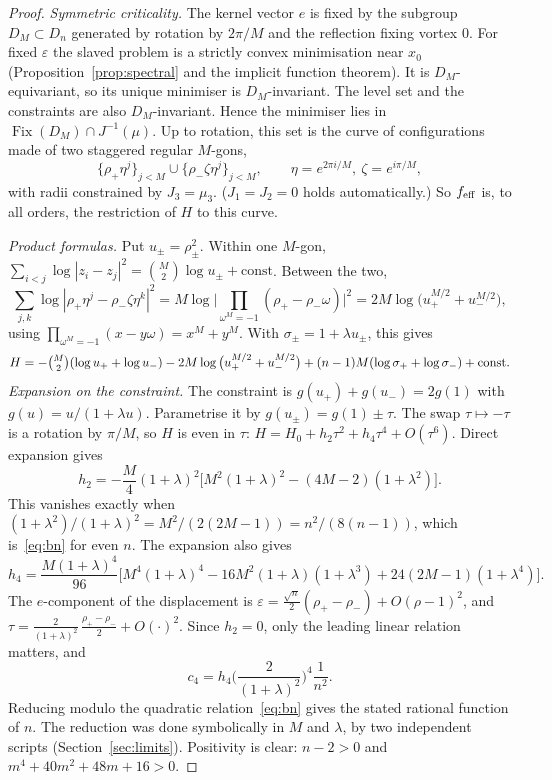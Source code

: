 \documentclass[11pt]{article}
\theoremstyle{definition}
\theoremstyle{remark}
\begin{document}
\begin{proof}
\emph{Symmetric criticality.} The kernel vector $e$ is fixed by the subgroup $D_M\subset D_n$ generated by
rotation by $2\pi/M$ and the reflection fixing vortex $0$. For fixed $\varepsilon$ the slaved problem is a
strictly convex minimisation near $x_0$ (Proposition~\ref{prop:spectral} and the implicit function
theorem). It is $D_M$-equivariant, so its unique minimiser is $D_M$-invariant. The level set and the
constraints are also $D_M$-invariant. Hence the minimiser lies in $\operatorname{Fix}(D_M)\cap J^{-1}(\mu)$.
Up to rotation, this set is the curve of configurations made of two staggered regular $M$-gons,
\[
\{\rho_+\eta^j\}_{j<M}\cup\{\rho_-\zeta\eta^j\}_{j<M},\qquad \eta=e^{2\pi i/M},\ \zeta=e^{i\pi/M},
\]
with radii constrained by $J_3=\mu_3$. ($J_1=J_2=0$ holds automatically.) So $f_{\rm eff}$ is, to all orders,
the restriction of $H$ to this curve.

\emph{Product formulas.} Put $u_\pm=\rho_\pm^2$. Within one $M$-gon,
$\sum_{i<j}\log|z_i-z_j|^2=\binom M2\log u_\pm+\text{const}$. Between the two,
\[
\sum_{j,k}\log|\rho_+\eta^j-\rho_-\zeta\eta^k|^2=M\log\Big|\prod_{\omega^M=-1}(\rho_+-\rho_-\omega)\Big|^2
=2M\log\big(u_+^{M/2}+u_-^{M/2}\big),
\]
using $\prod_{\omega^M=-1}(x-y\omega)=x^M+y^M$. With $\sigma_\pm=1+\lambda u_\pm$, this gives
\[
H=-\tbinom M2(\log u_++\log u_-)-2M\log\big(u_+^{M/2}+u_-^{M/2}\big)+(n-1)M(\log\sigma_++\log\sigma_-)
+\text{const}.
\]
\emph{Expansion on the constraint.} The constraint is $g(u_+)+g(u_-)=2g(1)$ with $g(u)=u/(1+\lambda u)$.
Parametrise it by $g(u_\pm)=g(1)\pm\tau$. The swap $\tau\mapsto-\tau$ is a rotation by $\pi/M$, so $H$ is
even in $\tau$: $H=H_0+h_2\tau^2+h_4\tau^4+O(\tau^6)$. Direct expansion gives
\[
h_2=-\frac M4(1+\lambda)^2\big[M^2(1+\lambda)^2-(4M-2)(1+\lambda^2)\big].
\]
This vanishes exactly when $(1+\lambda^2)/(1+\lambda)^2=M^2/(2(2M-1))=n^2/(8(n-1))$, which is~\eqref{eq:bn}
for even $n$. The expansion also gives
\[
h_4=\frac{M(1+\lambda)^4}{96}\Big[M^4(1+\lambda)^4-16M^2(1+\lambda)(1+\lambda^3)+24(2M-1)(1+\lambda^4)\Big].
\]
The $e$-component of the displacement is $\varepsilon=\tfrac{\sqrt n}{2}(\rho_+-\rho_-)+O(\rho-1)^2$, and
$\tau=\tfrac{2}{(1+\lambda)^2}\,\tfrac{\rho_+-\rho_-}2+O(\cdot)^2$. Since $h_2=0$, only the leading linear
relation matters, and
\[
c_4=h_4\Big(\frac{2}{(1+\lambda)^2}\Big)^4\frac1{n^2}.
\]
Reducing modulo the quadratic relation~\eqref{eq:bn} gives the stated rational function of $n$. The
reduction was done symbolically in $M$ and $\lambda$, by two independent scripts
(Section~\ref{sec:limits}). Positivity is clear: $n-2>0$ and $m^4+40m^2+48m+16>0$.
\end{proof}
\end{document}
